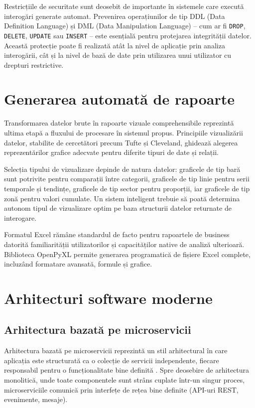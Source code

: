\documentclass[12pt, a4paper]{report}
\newcommand{\code}[1]{\texttt{#1}}
\begin{document}
Restricțiile de securitate sunt deosebit de importante în sistemele care execută interogări generate automat. Prevenirea operațiunilor de tip DDL (Data Definition Language) și DML (Data Manipulation Language) -- cum ar fi \code{DROP}, \code{DELETE}, \code{UPDATE} sau \code{INSERT} -- este esențială pentru protejarea integrității datelor. Această protecție poate fi realizată atât la nivel de aplicație prin analiza interogării, cât și la nivel de bază de date prin utilizarea unui utilizator cu drepturi restrictive.

\section{Generarea automată de rapoarte}

Transformarea datelor brute în rapoarte vizuale comprehensibile reprezintă ultima etapă a fluxului de procesare în sistemul propus. Principiile vizualizării datelor, stabilite de cercetători precum Tufte \cite{tufte} și Cleveland, ghidează alegerea reprezentărilor grafice adecvate pentru diferite tipuri de date și relații.

Selecția tipului de vizualizare depinde de natura datelor: graficele de tip bară sunt potrivite pentru comparații între categorii, graficele de tip linie pentru serii temporale și tendințe, graficele de tip sector pentru proporții, iar graficele de tip zonă pentru valori cumulate. Un sistem inteligent trebuie să poată determina autonom tipul de vizualizare optim pe baza structurii datelor returnate de interogare.

Formatul Excel rămâne standardul de facto pentru rapoartele de business datorită familiarității utilizatorilor și capacităților native de analiză ulterioară. Biblioteca OpenPyXL \cite{openpyxl} permite generarea programatică de fișiere Excel complete, incluzând formatare avansată, formule și grafice.

\section{Arhitecturi software moderne}

\subsection{Arhitectura bazată pe microservicii}

Arhitectura bazată pe microservicii reprezintă un stil arhitectural în care aplicația este structurată ca o colecție de servicii independente, fiecare responsabil pentru o funcționalitate bine definită \cite{docker}. Spre deosebire de arhitectura monolitică, unde toate componentele sunt strâns cuplate într-un singur proces, microserviciile comunică prin interfețe de rețea bine definite (API-uri REST, evenimente, mesaje).
\end{document}
